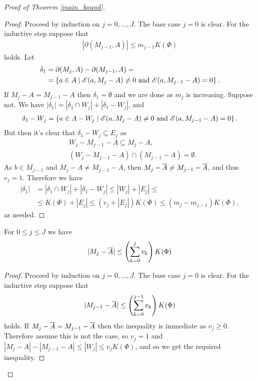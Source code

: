 \begin{proof} [Proof of Theorem \ref{main_bound}]
  \begin{proof} %
    Proceed by induction on $j = 0, \ldots, J$. The base case $j = 0$ is clear.
    For the inductive step suppose that
    \begin{align*}
      |\partial(M_{j-1}, A)| \leq m_{j-1}  K(\Phi)
    \end{align*}
    holds.
    Let
    \begin{align*}
      \delta_1 &= \partial(M_j, A) - \partial(M_{j-1}, A) = \\
               &=\left\{a \in A \mid  \mathscr E(a, M_j - A) \neq 0 \text{ and } \mathscr E(a, M_{j-1} - A) = 0\right\}.
    \end{align*}
    If $M_j - A = M_{j-1} - A$ then $\delta_1 = \emptyset$ and we are done as $m_j$ is increasing.
    Suppose not.
    We have $|\delta_1| = |\delta_1 \cap W_j| + |\delta_1 - W_j|$, and
    \begin{align*}
      \delta_1 - W_j = \left\{a \in A - W_j \mid \mathscr E(a, M_j - A) \neq 0 \text{ and } \mathscr E(a, M_{j-1} - A) = 0\right\}.
    \end{align*}
    But then it's clear that $\delta_1 - W_j \subseteq E_j$ as
    \begin{align*}
      &W_j - M_{j-1} - A \subseteq M_j - A, \\
      &(W_j - M_{j-1} - A) \cap (M_{j-1} - A) = \emptyset.
    \end{align*}
    As $b \in M_{j-1}$ and $M_j - A \neq M_{j-1} - A$, then $M_j - \overline{A} \neq M_{j-1} - \overline{A}$, and thus $v_j = 1$. 
    Therefore we have
    \begin{align*}
      |\delta_1| &= |\delta_1 \cap W_j| + |\delta_1 - W_j| \leq |W_j| + |E_j| \leq \\
      &\leq K(\Phi) + |E_j|
      \leq (v_j + |E_j|) K(\Phi)  \leq (m_j - m_{j-1}) K(\Phi),
    \end{align*}
    as needed.
  \end{proof}

  \begin{Lemma} \label{ub_lemma}
    For $0 \leq j \leq J$ we have
    \begin{align*}
      |M_j - \overline{A}| \leq \left(\sum_{k=0}^j v_{k}\right) K(\Phi)
    \end{align*}
  \end{Lemma}

  \begin{proof} %
    Proceed by induction on $j = 0, \ldots, J$. The base case $j = 0$ is clear.
    For the inductive step suppose that
    \begin{align*}
      |M_{j-1} - \overline{A}| \leq \left(\sum_{k=0}^{j-1} v_{k}\right) K(\Phi)
    \end{align*}
    holds.
    If $M_j - \overline{A} = M_{j-1} - \overline{A}$ then the inequality is immediate as $v_j \geq 0$.
    Therefore assume this is not the case, so $v_j = 1$ and $|M_j - A| - |M_{j-1} - A| \leq |W_j| \leq v_j K(\Phi)$, and so we get the required inequality.
  \end{proof}
  

\end{proof}
